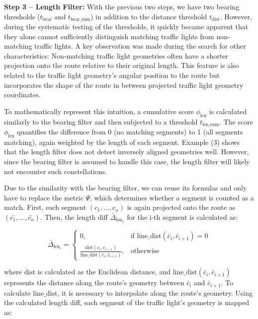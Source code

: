 \textbf{\color{cidarkblue}Step 3 -- Length Filter:} With the previous two steps, we have two bearing thresholds ($t_{\text{bear}}$ and $t_{\text{bear\_sum}}$) in addition to the distance threshold $t_{\text{dist}}$. However, during the systematic testing of the thresholds, it quickly became apparent that they alone cannot sufficiently distinguish matching traffic lights from non-matching traffic lights. A key observation was made during the search for other characteristics: Non-matching traffic light geometries often have a shorter projection onto the route relative to their original length. This feature is also related to the traffic light geometry's angular position to the route but incorporates the shape of the route in between projected traffic light geometry coordinates.

To mathematically represent this intuition, a cumulative score $\phi_{\text{len}}$ is calculated similarly to the bearing filter and then subjected to a threshold $t_{\text{len\_sum}}$. The score $\phi_{\text{len}}$ quantifies the difference from 0 (no matching segments) to 1 (all segments matching), again weighted by the length of each segment. Example (3) shows that the length filter does not detect inversely aligned geometries well. However, since the bearing filter is assumed to handle this case, the length filter will likely not encounter such constellations.

Due to the similarity with the bearing filter, we can reuse its formulas and only have to replace the metric $\Psi$, which determines whether a segment is counted as a match. First, each segment $(c_1, \dots, c_n)$ is again projected onto the route as $(\bar{c_1}, \dots, \bar{c_n})$. Then, the length diff $\bar{\Delta}_{\text{len}_1}$ for the i-th segment is calculated as:

\begin{equation}
    \bar{\Delta}_{\text{len}_i} = 
        \begin{cases}
            0,& \text{if } \text{line\_dist}(\bar{c}_i, \bar{c}_{i+1}) = 0 \\
            \frac{\text{dist}(c_{i}, c_{i+1})}{\text{line\_dist}(\bar{c}_{i}, \bar{c}_{i+1})},              & \text{otherwise}
        \end{cases}
\end{equation}

where $\text{dist}$ is calculated as the Euclidean distance, and $\text{line\_dist}(\bar{c}_i, \bar{c}_{i+1})$ represents the distance along the route's geometry between $\bar{c}_i$ and $\bar{c}_{i+1}$. To calculate $\text{line\_dist}$, it is necessary to interpolate along the route's geometry. Using the calculated length diff, each segment of the traffic light's geometry is mapped as:

